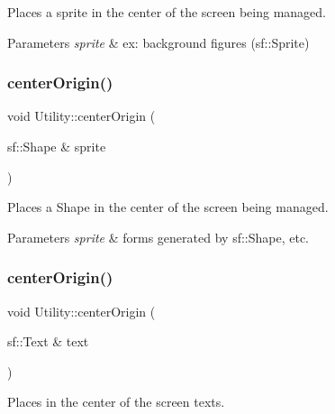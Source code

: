 Places a sprite in the center of the screen being managed. 


\begin{DoxyParams}{Parameters}
{\em sprite} & ex\+: background figures (sf\+::\+Sprite) \\
\hline
\end{DoxyParams}
\mbox{\label{classUtility_afb1f918173dab3a113304952b7d5fb86}} 
\subsubsection{\texorpdfstring{center\+Origin()}{centerOrigin()}\hspace{0.1cm}{\footnotesize\ttfamily [2/3]}}
{\footnotesize\ttfamily void Utility\+::center\+Origin (\begin{DoxyParamCaption}\item[{sf\+::\+Shape \&}]{sprite }\end{DoxyParamCaption})\hspace{0.3cm}{\ttfamily [static]}}



Places a Shape in the center of the screen being managed. 


\begin{DoxyParams}{Parameters}
{\em sprite} & forms generated by sf\+::\+Shape, etc. \\
\hline
\end{DoxyParams}
\mbox{\label{classUtility_ac60c8088a90a2839e35d79d8ac8c8a50}} 
\subsubsection{\texorpdfstring{center\+Origin()}{centerOrigin()}\hspace{0.1cm}{\footnotesize\ttfamily [3/3]}}
{\footnotesize\ttfamily void Utility\+::center\+Origin (\begin{DoxyParamCaption}\item[{sf\+::\+Text \&}]{text }\end{DoxyParamCaption})\hspace{0.3cm}{\ttfamily [static]}}



Places in the center of the screen texts. 


